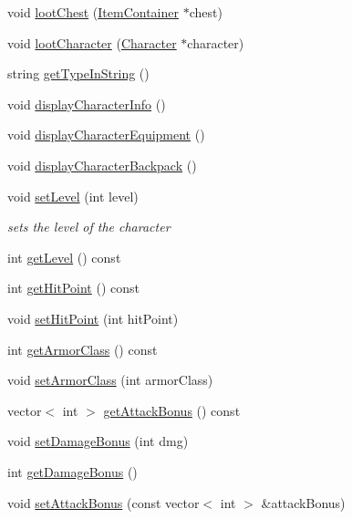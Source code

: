 \begin{DoxyCompactItemize}
void \hyperlink{class_character_a29b8aa0e775c4f1a491d9ef77b9edff3}{loot\+Chest} (\hyperlink{class_item_container}{Item\+Container} $\ast$chest)
\item 
void \hyperlink{class_character_ad49924a7c476a923ecc9fd113c38256d}{loot\+Character} (\hyperlink{class_character}{Character} $\ast$character)
\item 
string \hyperlink{class_character_a935d99e0b3aa3a9a0055b35c1b4a357b}{get\+Type\+In\+String} ()
\item 
void \hyperlink{class_character_a0f993af09d2137001b12ab7b7415a55b}{display\+Character\+Info} ()
\item 
void \hyperlink{class_character_a813ec19baa7254c2591bc07ca53b7f3e}{display\+Character\+Equipment} ()
\item 
void \hyperlink{class_character_a6b2ede9b2a598c04492711e0863d2ca8}{display\+Character\+Backpack} ()
\item 
\hypertarget{class_character_ac206c1a24603accc6ec9ab30ca22bab1}{}\label{class_character_ac206c1a24603accc6ec9ab30ca22bab1} 
void \hyperlink{class_character_ac206c1a24603accc6ec9ab30ca22bab1}{set\+Level} (int level)
\begin{DoxyCompactList}\small\item\em sets the level of the character \end{DoxyCompactList}\item 
int \hyperlink{class_character_a06713215a5850ec92194a1a711fb8cd7}{get\+Level} () const
\item 
int \hyperlink{class_character_a45d67678325375d1c0cfb7fc5cc32ec1}{get\+Hit\+Point} () const
\item 
void \hyperlink{class_character_ae4a09aee346b3e2cc86580e8b42a1a34}{set\+Hit\+Point} (int hit\+Point)
\item 
int \hyperlink{class_character_a6674dec79e4677370162aeb5674084bf}{get\+Armor\+Class} () const
\item 
void \hyperlink{class_character_a5b03ceb09b3e175dc9d6c3247a6b9b66}{set\+Armor\+Class} (int armor\+Class)
\item 
vector$<$ int $>$ \hyperlink{class_character_a2b4ae8b5bddbc8f3da69d50af8d1859a}{get\+Attack\+Bonus} () const
\item 
void \hyperlink{class_character_a04149679169d970edde15b0d3e6e9428}{set\+Damage\+Bonus} (int dmg)
\item 
int \hyperlink{class_character_a20ac6eab8a1df8ce849ad1015f656f96}{get\+Damage\+Bonus} ()
\item 
void \hyperlink{class_character_a4b87bdb15a0e37b4bfecb661822738ad}{set\+Attack\+Bonus} (const vector$<$ int $>$ \&attack\+Bonus)

\end{DoxyCompactItemize}
